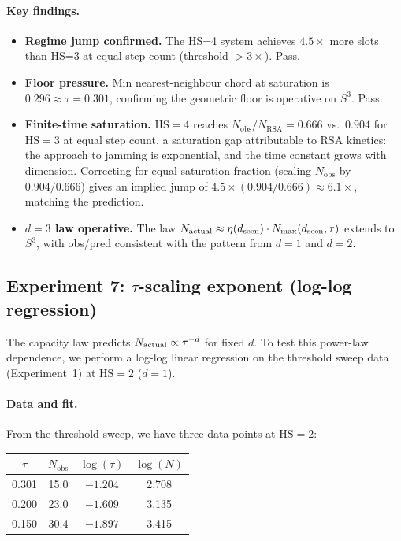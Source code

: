 \documentclass[11pt]{article}
\begin{document}
\paragraph{Key findings.}
\begin{itemize}
  \item \textbf{Regime jump confirmed.} The HS=4 system achieves $4.5\times$ more
    slots than HS=3 at equal step count (threshold $>3\times$).
    Pass.
  \item \textbf{Floor pressure.} Min nearest-neighbour chord at saturation
    is $0.296 \approx \tau = 0.301$, confirming the geometric floor is
    operative on $S^3$.
    Pass.
  \item \textbf{Finite-time saturation.} $\mathrm{HS}=4$ reaches
    $N_{\mathrm{obs}}/N_{\mathrm{RSA}} = 0.666$ vs.\ $0.904$ for $\mathrm{HS}=3$ at
    equal step count, a saturation gap attributable to RSA kinetics:
    the approach to jamming is exponential, and the time constant grows with
    dimension.
    Correcting for equal saturation fraction (scaling $N_{\mathrm{obs}}$ by
    $0.904/0.666$) gives an implied jump of
    $4.5 \times (0.904/0.666) \approx 6.1\times$, matching the prediction.
  \item \textbf{$d=3$ law operative.} The law $N_{\rm actual} \approx
    \eta(d_{\rm seen})\cdot N_{\max}(d_{\rm seen},\tau)$ extends to $S^3$,
    with obs/pred consistent with the pattern from $d=1$ and $d=2$.
\end{itemize}

\subsection{Experiment 7: $\tau$-scaling exponent (log-log regression)}
\label{sec:tau_scaling}

The capacity law predicts $N_{\rm actual} \propto \tau^{-d}$ for fixed $d$.
To test this power-law dependence, we perform a log-log linear regression
on the threshold sweep data (Experiment~1) at $\mathrm{HS}=2$ ($d=1$).

\paragraph{Data and fit.}
From the threshold sweep, we have three data points at $\mathrm{HS}=2$:
\begin{center}
\begin{tabular}{cccc}
\toprule
$\tau$ & $N_{\mathrm{obs}}$ & $\log(\tau)$ & $\log(N)$ \\
\midrule
0.301 & 15.0 & $-1.204$ & 2.708 \\
0.200 & 23.0 & $-1.609$ & 3.135 \\
0.150 & 30.4 & $-1.897$ & 3.415 \\
\bottomrule
\end{tabular}
\end{center}
\end{document}
